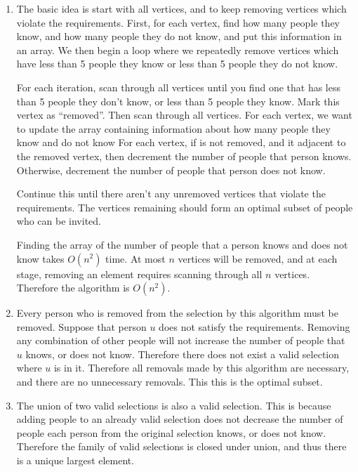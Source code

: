 \documentclass{article}
\begin{document}
\begin{solution}
\begin{enumerate}[label = (\alph*)]
    \item The basic idea is start with all vertices, and to keep removing vertices which violate the requirements.
    First, for each vertex, find how many people they know, and how many people they do not know, and put this information in an array.
    We then begin a loop where we repeatedly remove vertices which have less than 5 people they know or less than 5 people they do not know.

    For each iteration, scan through all vertices until you find one that has less than 5 people they don't know, or less than 5 people they know.
    Mark this vertex as ``removed''. Then scan through all vertices. 
    For each vertex, we want to update the array containing information about how many people they know and do not know
    For each vertex, if is not removed, and it adjacent to the removed vertex, then decrement the number of people that person knows.
    Otherwise, decrement the number of people that person does not know.

    Continue this until there aren't any unremoved vertices that violate the requirements.
    The vertices remaining should form an optimal subset of people who can be invited.
    
    Finding the array of the number of people that a person knows and does not know takes $O(n^2)$ time.
    At most $n$ vertices will be removed, and at each stage, removing an element requires scanning through all $n$ vertices.
    Therefore the algorithm is $O(n^2)$.

    \item Every person who is removed from the selection by this algorithm must be removed.
    Suppose that person $u$ does not satisfy the requirements. 
    Removing any combination of other people will not increase the number of people that $u$ knows, or does not know.
    Therefore there does not exist a valid selection where $u$ is in it. 
    Therefore all removals made by this algorithm are necessary, and there are no unnecessary removals.
    This this is the optimal subset.

    \item The union of two valid selections is also a valid selection. 
    This is because adding people to an already valid selection does not 
    decrease the number of people each person from the original selection knows, or does not know.
    Therefore the family of valid selections is closed under union, and thus there is a unique largest element.
\end{enumerate}
\end{solution}
\end{document}
